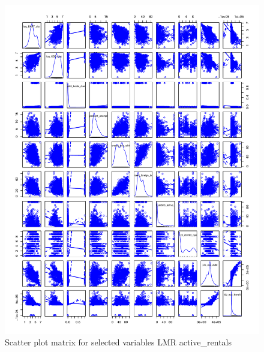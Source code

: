 \documentclass[10pt, letterpaper]{amsart}
\begin{document}
\begin{figure}[H]
  \caption{Scatter plot matrix for selected variables LMR active\_rentals}
  \includegraphics[scale=0.6]{spm_selected_LMR_activerentals}
\end{figure}

\end{document}
